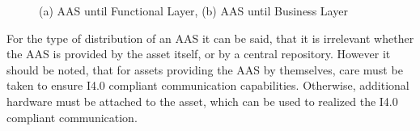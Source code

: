 \begin{figure}[h]
\centering
{}
\caption{(a) \ac{AAS} until Functional Layer, (b) \ac{AAS} until Business Layer}
\label{fig:aas-until-func-and-bizz-layer}
\end{figure}

For the type of distribution of an \ac{AAS} it can be said, that it is irrelevant whether the \ac{AAS} is provided by the asset itself, or by a central repository. However it should be noted, that for assets providing the \ac{AAS} by themselves, care must be taken to ensure \ac{I4.0} compliant communication capabilities. Otherwise, additional hardware must be attached to the asset, which can be used to realized the \ac{I4.0} compliant communication.  


